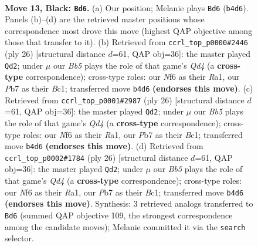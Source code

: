 \documentclass[11pt]{article}
\begin{document}
\clearpage

\begin{figure}[p]\centering
\begin{subfigure}{0.46\textwidth}\centering
\resizebox{\linewidth}{!}{%
\newchessgame
\chessboard[
  setfen={rn3rk1/1p1b1ppp/p1q1pn2/8/1b6/2NBPN2/PP1B1PPP/R2Q1RK1 b - - 7 13},
  showmover=false,
  pgfstyle=straightmove, color=movearrow, markmove={b4-d6}
]}
\caption{}
\end{subfigure}\hfill
\begin{subfigure}{0.46\textwidth}\centering
\resizebox{\linewidth}{!}{%
\newchessgame
\chessboard[
  setfen={r1bq1rk1/1pb2ppp/pn2pn2/8/PP1Q4/2N1PN2/4BPPP/R1B2RK1 w - - 1 14},
  showmover=false,
  pgfstyle=straightmove, color=movearrow, markmove={d4-d2}
]}
\caption{}
\end{subfigure}
\\[4pt]
\begin{subfigure}{0.46\textwidth}\centering
\resizebox{\linewidth}{!}{%
\newchessgame
\chessboard[
  setfen={r1bq1rk1/1pb2ppp/pn2pn2/8/PP1Q4/2N1PN2/4BPPP/R1B2RK1 w - - 1 14},
  showmover=false,
  pgfstyle=straightmove, color=movearrow, markmove={d4-d2}
]}
\caption{}
\end{subfigure}\hfill
\begin{subfigure}{0.46\textwidth}\centering
\resizebox{\linewidth}{!}{%
\newchessgame
\chessboard[
  setfen={r1bq1rk1/1pb2ppp/pn2pn2/8/PP1Q4/2N1PN2/4BPPP/R1B2RK1 w - - 1 14},
  showmover=false,
  pgfstyle=straightmove, color=movearrow, markmove={d4-d2}
]}
\caption{}
\end{subfigure}
\caption{\textbf{Move 13, Black: \texttt{Bd6}.} (a) Our position; Melanie plays \texttt{Bd6} (\texttt{b4d6}). Panels (b)--(d) are the retrieved master positions whose correspondence most drove this move (highest QAP objective among those that transfer to it). (b) Retrieved from \texttt{ccrl\_top\_p0000\#2446} (ply 26) [structural distance $d$=61, QAP obj=36]: the master played \texttt{Qd2}; under $\mu$ our \emph{Bb5} plays the role of that game's \emph{Qd4} (a \textbf{cross-type} correspondence); cross-type roles: our \emph{N}f6 as their \emph{R}a1, our \emph{P}b7 as their \emph{B}c1; transferred move \texttt{b4d6} \textbf{(endorses this move)}. (c) Retrieved from \texttt{ccrl\_top\_p0001\#2987} (ply 26) [structural distance $d$=61, QAP obj=36]: the master played \texttt{Qd2}; under $\mu$ our \emph{Bb5} plays the role of that game's \emph{Qd4} (a \textbf{cross-type} correspondence); cross-type roles: our \emph{N}f6 as their \emph{R}a1, our \emph{P}b7 as their \emph{B}c1; transferred move \texttt{b4d6} \textbf{(endorses this move)}. (d) Retrieved from \texttt{ccrl\_top\_p0002\#1784} (ply 26) [structural distance $d$=61, QAP obj=36]: the master played \texttt{Qd2}; under $\mu$ our \emph{Bb5} plays the role of that game's \emph{Qd4} (a \textbf{cross-type} correspondence); cross-type roles: our \emph{N}f6 as their \emph{R}a1, our \emph{P}b7 as their \emph{B}c1; transferred move \texttt{b4d6} \textbf{(endorses this move)}. Synthesis: 3 retrieved analogs transferred to \texttt{Bd6} (summed QAP objective 109, the strongest correspondence among the candidate moves); Melanie committed it via the \texttt{search} selector.}
\label{fig:thought-m25}
\end{figure}
\end{document}
